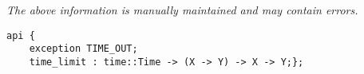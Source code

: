 \label{pkg:time\_limit}

{\tiny \it The above information is manually maintained and may contain errors.}
\begin{verbatim}
api {
    exception TIME_OUT;
    time_limit : time::Time -> (X -> Y) -> X -> Y;};
\end{verbatim}
